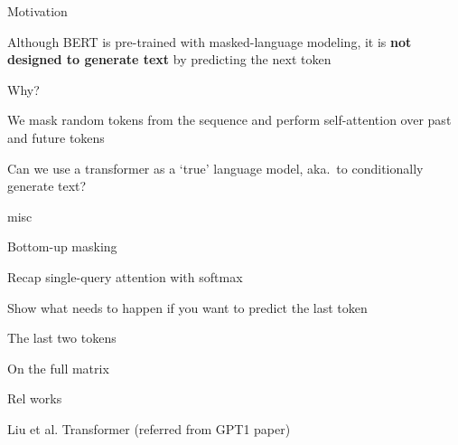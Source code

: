 \documentclass[12pt,aspectratio=169,handout]{beamer}
\begin{document}
\begin{frame}{Motivation}
	

Although BERT is pre-trained with masked-language modeling, it is \textbf{not designed to generate text} by predicting the next token

Why?
\pause

We mask random tokens from the sequence and perform self-attention over past and future tokens

\bigskip

Can we use a transformer as a `true' language model, aka.\ to conditionally generate text?
	
\end{frame}

\begin{frame}{misc}

Bottom-up masking


Recap single-query attention with softmax

Show what needs to happen if you want to predict the last token

The last two tokens

On the full matrix




\end{frame}



\begin{frame}{Rel works}
	
Liu et al. Transformer (referred from GPT1 paper)


	
\end{frame}
\end{document}
